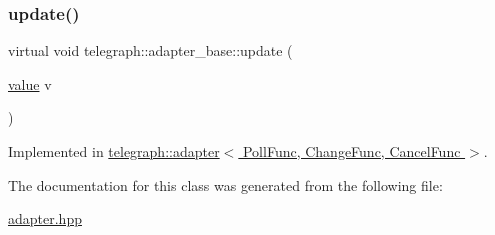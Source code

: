 \subsubsection{\texorpdfstring{update()}{update()}}
{\footnotesize\ttfamily virtual void telegraph\+::adapter\+\_\+base\+::update (\begin{DoxyParamCaption}\item[{\hyperlink{classtelegraph_1_1value}{value}}]{v }\end{DoxyParamCaption})\hspace{0.3cm}{\ttfamily [pure virtual]}}



Implemented in \hyperlink{classtelegraph_1_1adapter_aabfebfcdec55822a0a5228277205ab47}{telegraph\+::adapter$<$ Poll\+Func, Change\+Func, Cancel\+Func $>$}.



The documentation for this class was generated from the following file\+:\begin{DoxyCompactItemize}
\item 
\hyperlink{adapter_8hpp}{adapter.\+hpp}\end{DoxyCompactItemize}
